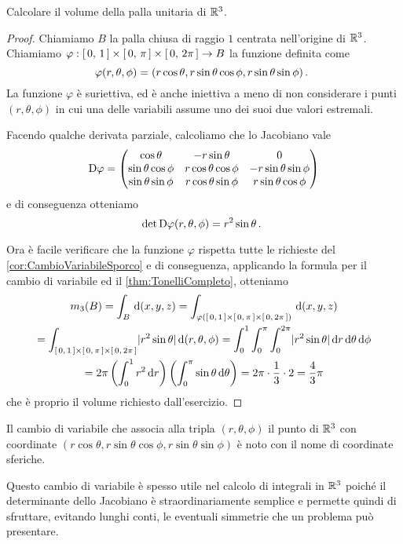 \begin{exercise}
	Calcolare il volume della palla unitaria di $\mathbb R^3$.
\end{exercise}
\begin{proof}
	Chiamiamo $B$ la palla chiusa di raggio $1$ centrata nell'origine di $\mathbb R^3$.
	Chiamiamo $\varphi:\left[\,0,\,1\,\right]\times\left[\,0,\,\pi\,\right]\times\left[\,0,\,2\pi\,\right]\to B$ la funzione definita come
	\begin{equation*}
		\varphi(r,\theta,\phi)=(r\cos\theta,r\sin\theta\cos\phi,r\sin\theta\sin\phi)\, \text{. }
	\end{equation*}
	La funzione $\varphi$ è suriettiva, ed è anche iniettiva a meno di non considerare i punti $(r,\theta,\phi)$ in cui una delle variabili assume uno dei suoi due valori estremali.
	
	Facendo qualche derivata parziale, calcoliamo che lo Jacobiano vale
	\begin{equation*}
		\mathrm D\varphi=
		\begin{pmatrix}
		\cos\theta 			&	-r\sin\theta		&	0						\\
		\sin\theta\cos\phi	&	r\cos\theta\cos\phi	&	-r\sin\theta\sin\phi	\\
		\sin\theta\sin\phi	&	r\cos\theta\sin\phi	&	r\sin\theta\cos\phi
		\end{pmatrix}
	\end{equation*}
	e di conseguenza otteniamo
	\begin{equation*}
		\det \mathrm D\varphi(r,\theta,\phi)= r^2\sin\theta \, \text{. }
	\end{equation*}
	
	Ora è facile verificare che la funzione $\varphi$ rispetta tutte le richieste del \cref{cor:CambioVariabileSporco} e di conseguenza, applicando la formula per il cambio di variabile ed il \cref{thm:TonelliCompleto}, otteniamo
	\begin{multline*}
		m_3(B)=\int_B \,\mathrm d(x,y,z)=\int_{\varphi\left(\left[\,0,\,1\,\right]\times\left[\,0,\,\pi\,\right]\times\left[\,0,\,2\pi\,\right]\right)}\,\mathrm d(x,y,z)\\
		=\int_{\left[\,0,\,1\,\right]\times\left[\,0,\,\pi\,\right]\times\left[\,0,\,2\pi\,\right]} \lvert r^2\sin\theta\rvert\,\mathrm d(r,\theta,\phi)=\int_0^1\int_0^\pi\int_0^{2\pi}\lvert r^2\sin\theta\rvert\,\mathrm d r\,\mathrm d\theta\,\mathrm d\phi\\
		=2\pi\left(\int_0^1 r^2\,\mathrm d r\right)\left(\int_0^\pi\sin\theta\,\mathrm d\theta\right)=2\pi\cdot\frac 13\cdot 2=\frac 43\pi
	\end{multline*}
	che è proprio il volume richiesto dall'esercizio.
\end{proof}
\begin{remark}\label{nota:CoordinateSferiche}
	Il cambio di variabile che associa alla tripla $(r,\theta,\phi)$ il punto di $\mathbb R^3$ con coordinate $(r\cos\theta,r\sin\theta\cos\phi,r\sin\theta\sin\phi)$ è noto con il nome di coordinate sferiche.
	
	Questo cambio di variabile è spesso utile nel calcolo di integrali in $\mathbb R^3$ poiché il determinante dello Jacobiano è straordinariamente semplice e permette quindi di sfruttare, evitando lunghi conti, le eventuali simmetrie che un problema può presentare.
\end{remark}


